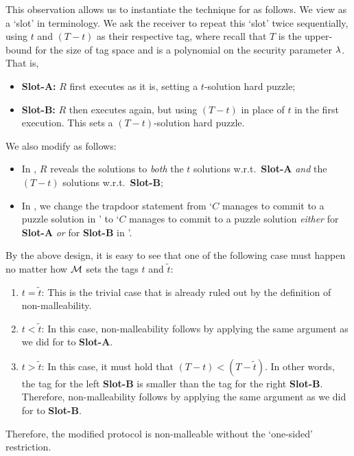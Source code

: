 This observation allows us to instantiate the \cite{STOC:PasRos05} technique for  as follows. We view  as a `slot' in \cite{STOC:PasRos05} terminology. We ask the receiver to repeat this `slot' twice sequentially, using $t$ and $(T-t)$ as their respective tag, where recall that $T$ is the upper-bound for the size of tag space and is a polynomial on the security parameter $\lambda$. That is,
\begin{itemize}
 \item
 {\bf Slot-A:}
$R$ first executes  as it is, setting a $t$-solution hard puzzle;
\item
{\bf Slot-B:}
$R$ then executes  again, but using $(T-t)$ in place of $t$ in the first execution. This sets a $(T-t)$-solution hard puzzle. 
 \end{itemize} 
We also modify  as follows:
\begin{itemize}
 \item
In , $R$ reveals the solutions to {\em both} the $t$ solutions w.r.t.\ {\bf Slot-A} {\em and} the $(T-t)$ solutions w.r.t.\ {\bf Slot-B};
\item
In , we change the trapdoor statement from `$C$ manages to commit to a puzzle solution in ' to `$C$ manages to commit to a puzzle solution {\em either} for {\bf Slot-A} {\em or} for {\bf Slot-B} in '.
 \end{itemize} 
By the above design, it is easy to see that one of the following case must happen no matter how $\mathcal{M}$ sets the tags $t$ and $\tilde{t}$:
\begin{enumerate}
\item
{$t = \tilde{t}$:} This is the trivial case that is already ruled out by the definition of non-malleability.
\item
{$t < \tilde{t}$:} In this case, non-malleability follows by applying the same argument as we did for  to {\bf Slot-A}. 
\item
{$t > \tilde{t}$:} In this case, it must hold that $(T-t) < (T-\tilde{t})$. In other words, the tag for the left {\bf Slot-B} is smaller than the tag for the right {\bf Slot-B}. Therefore,  non-malleability follows by applying the same argument as we did for  to {\bf Slot-B}. 
\end{enumerate}
Therefore, the modified protocol is non-malleable without the `one-sided' restriction.


